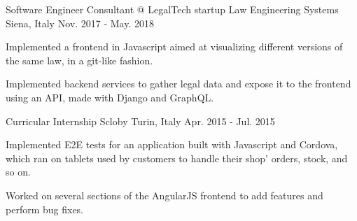 \begin{cventries}
  \cventry
    {Software Engineer Consultant @ LegalTech startup} %
    {Law Engineering Systems} %
    {Siena, Italy} %
    {Nov. 2017 - May. 2018} %
    {
      \begin{cvitems} %
        \item {Implemented a frontend in Javascript aimed at visualizing different versions of the same law, in a git-like fashion.}
        \item {Implemented backend services to gather legal data and expose it to the frontend using an API, made with Django and GraphQL.}
      \end{cvitems}
    }

  \cventry
    {Curricular Internship} %
    {Scloby} %
    {Turin, Italy} %
    {Apr. 2015 - Jul. 2015} %
    {
      \begin{cvitems} %
        \item {Implemented E2E tests for an application built with Javascript and Cordova, which ran on tablets used by customers to handle their shop' orders, stock, and so on.}
        \item {Worked on several sections of the AngularJS frontend to add features and perform bug fixes.}
      \end{cvitems}
    }

\end{cventries}

